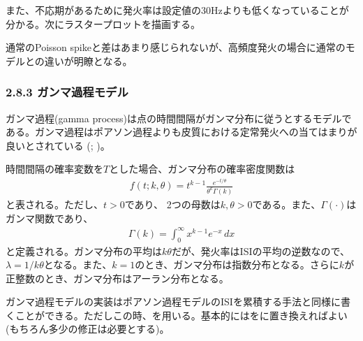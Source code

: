 \documentclass[letterpaper,10pt,english]{sphinxmanual}
\begin{document}
また、不応期があるために発火率は設定値の30Hzよりも低くなっていることが分かる。次にラスタープロットを描画する。

\begin{sphinxVerbatim}[commandchars=\\\{\}]
\end{sphinxVerbatim}

通常のPoisson spikeと差はあまり感じられないが、高頻度発火の場合に通常のモデルとの違いが明瞭となる。


\subsubsection{2.8.3 ガンマ過程モデル}
\label{\detokenize{2-8_isi:id7}}
ガンマ過程(gamma process)は点の時間間隔がガンマ分布に従うとするモデルである。ガンマ過程はポアソン過程よりも皮質における定常発火への当てはまりが良いとされている (; )。

時間間隔の確率変数を\(T\)とした場合、ガンマ分布の確率密度関数は
\begin{equation*}
\begin{split}
\begin{equation}
f(t;k,\theta) =  t^{k-1}\frac{e^{-t/\theta}}{\theta^k\Gamma(k)}
\end{equation}
\end{split}
\end{equation*}
と表される。ただし、\(t > 0\)であり、 2つの母数は\(k, \theta > 0\)である。また、\(\Gamma (\cdot)\)はガンマ関数であり、
\begin{equation*}
\begin{split}
\begin{equation}
\Gamma (k)=\int _{0}^{\infty }x^{k-1}e^{-x}\,dx
\end{equation}
\end{split}
\end{equation*}
と定義される。ガンマ分布の平均は\(k\theta\)だが、発火率はISIの平均の逆数なので、\(\lambda=1/k\theta\)となる。また、\(k=1\)のとき、ガンマ分布は指数分布となる。さらに\(k\)が正整数のとき、ガンマ分布はアーラン分布となる。

ガンマ過程モデルの実装はポアソン過程モデルのISIを累積する手法と同様に書くことができる。ただしこの時、を用いる。基本的にはをに置き換えればよい (もちろん多少の修正は必要とする)。
\end{document}
